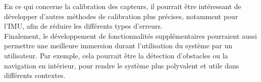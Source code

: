  En ce qui concerne la calibration des capteurs, il pourrait être intéressant de développer d'autres méthodes de calibration plus précises, notamment pour l'IMU, afin de réduire les différents types d'erreurs.\\

Finalement, le développement de fonctionnalités supplémentaires pourraient aussi permettre une meilleure immersion durant l'utilisation du système par un utilisateur. Par exemple, cela pourrait être la détection d'obstacles ou la navigation en intérieur, pour rendre le système plus polyvalent et utile dans différents contextes.

